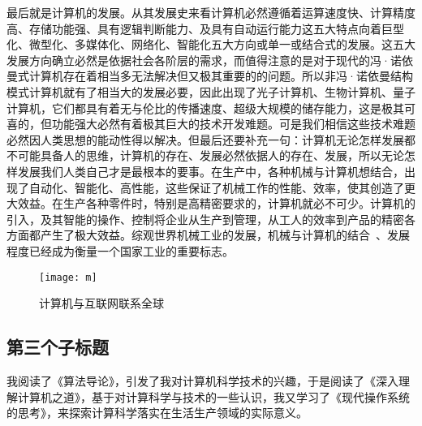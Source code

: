 \documentclass{article}
\begin{document}
最后就是计算机的发展。从其发展史来看计算机必然遵循着运算速度快、计算精度高、存储功能强、具有逻辑判断能力、及具有自动运行能力这五大特点向着巨型化、微型化、多媒体化、网络化、智能化五大方向或单一或结合式的发展。这五大发展方向确立必然是依据社会各阶层的需求，而值得注意的是对于现代的冯·诺依曼式计算机存在着相当多无法解决但又极其重要的的问题。所以非冯·诺依曼结构模式计算机就有了相当大的发展必要，因此出现了光子计算机、生物计算机、量子计算机，它们都具有着无与伦比的传播速度、超级大规模的储存能力，这是极其可喜的，但功能强大必然有着极其巨大的技术开发难题。可是我们相信这些技术难题必然因人类思想的能动性得以解决。但最后还要补充一句：计算机无论怎样发展都不可能具备人的思维，计算机的存在、发展必然依据人的存在、发展，所以无论怎样发展我们人类自己才是最根本的要事。在生产中，各种机械与计算机想结合，出现了自动化、智能化、高性能，这些保证了机械工作的性能、效率，使其创造了更大效益。在生产各种零件时，特别是高精密要求的，计算机就必不可少。计算机的引入，及其智能的操作、控制将企业从生产到管理，从工人的效率到产品的精密各方面都产生了极大效益。综观世界机械工业的发展，机械与计算机的结合 、发展程度已经成为衡量一个国家工业的重要标志。\par
\begin{figure}[h!]
	\centering
	\texttt{[image: m]}
	\caption{计算机与互联网联系全球}
	\label{fig:m}
\end{figure}
\subsection{第三个子标题}
\par
我阅读了《算法导论》\citep{Thomas}，引发了我对计算机科学技术的兴趣，于是阅读了《深入理解计算机之道》\citep{liujiang}，基于对计算科学与技术的一些认识，我又学习了《现代操作系统的思考》\citep{gu}，来探索计算科学落实在生活生产领域的实际意义。\par
\end{document}
